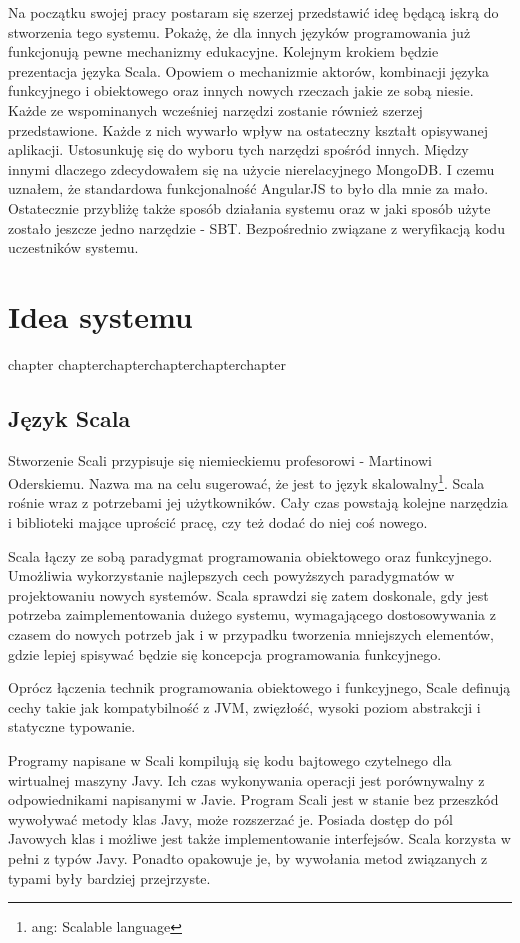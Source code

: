 \documentclass[brudnopis]{xmgr}
\begin{document}
\medskip Na początku swojej pracy postaram się szerzej przedstawić ideę będącą iskrą do stworzenia tego systemu. Pokażę, że dla innych języków programowania już funkcjonują pewne mechanizmy edukacyjne. Kolejnym krokiem będzie prezentacja języka Scala. Opowiem o mechanizmie aktorów, kombinacji języka funkcyjnego i obiektowego oraz innych nowych rzeczach jakie ze sobą niesie. Każde ze wspominanych wcześniej narzędzi zostanie również szerzej przedstawione. Każde z nich wywarło wpływ na ostateczny kształt opisywanej aplikacji. Ustosunkuję się do wyboru tych narzędzi spośród innych. Między innymi dlaczego zdecydowałem się na użycie nierelacyjnego MongoDB. I czemu uznałem, że standardowa funkcjonalność AngularJS to było dla mnie za mało. Ostatecznie przybliżę także sposób działania systemu oraz w jaki sposób użyte zostało jeszcze jedno narzędzie - SBT. Bezpośrednio związane z weryfikacją kodu uczestników systemu. 

\chapter{Idea systemu}

chapter chapterchapterchapterchapterchapter 

\section{Język Scala}

Stworzenie Scali przypisuje się niemieckiemu profesorowi - Martinowi Oderskiemu. Nazwa ma na celu sugerować, że jest to język skalowalny\footnote{ang: Scalable language}. Scala rośnie wraz z potrzebami jej użytkowników. Cały czas powstają kolejne narzędzia i biblioteki mające uprościć pracę, czy też dodać do niej coś nowego. 

Scala łączy ze sobą paradygmat programowania obiektowego oraz funkcyjnego. Umożliwia wykorzystanie najlepszych cech powyższych paradygmatów w projektowaniu nowych systemów. Scala sprawdzi się zatem doskonale, gdy jest potrzeba zaimplementowania dużego systemu, wymagającego dostosowywania z czasem do nowych potrzeb jak i w przypadku tworzenia mniejszych elementów, gdzie lepiej spisywać będzie się koncepcja programowania funkcyjnego.   

Oprócz łączenia technik programowania obiektowego i funkcyjnego, Scale definują cechy takie jak kompatybilność z JVM, zwięzłość, wysoki poziom abstrakcji i statyczne typowanie. 

Programy napisane w Scali kompilują się kodu bajtowego czytelnego dla wirtualnej maszyny Javy. Ich czas wykonywania operacji jest porównywalny z odpowiednikami napisanymi w Javie. Program Scali jest w stanie bez przeszkód wywoływać metody klas Javy, może rozszerzać je. Posiada dostęp do pól Javowych klas i możliwe jest także implementowanie interfejsów. Scala korzysta w pełni z typów Javy. Ponadto opakowuje je, by wywołania metod związanych z typami były bardziej przejrzyste. 
\end{document}
